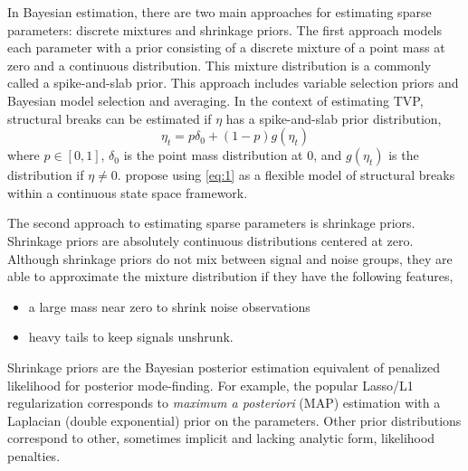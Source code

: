 \documentclass{article}
\begin{document}
In Bayesian estimation, there are two main approaches for estimating sparse parameters: discrete mixtures and shrinkage priors.
The first approach models each parameter with a prior consisting of a discrete mixture of a point mass at zero and a continuous distribution.
This mixture distribution is a commonly called a spike-and-slab prior.
This approach includes variable selection priors and Bayesian model selection and averaging.
In the context of estimating TVP, structural breaks can be estimated if $\eta$ has a spike-and-slab prior distribution,
\begin{equation}
  \label{eq:1}
  \eta_{t} = p \delta_{0} +  (1 - p) g(\eta_{t})
\end{equation}
where $p \in [0, 1]$, $\delta_{0}$ is the point mass distribution at 0, and $g(\eta_{t})$ is the distribution if $\eta \neq 0$.
\textcite{GiordaniKohn2008} propose using \eqref{eq:1} as a flexible model of structural breaks within a continuous state space framework.

The second approach to estimating sparse parameters is shrinkage priors. 
Shrinkage priors are absolutely continuous distributions centered at zero.
Although shrinkage priors do not mix between signal and noise groups, they are able to approximate the mixture distribution if they have the following features,
\begin{itemize}
\item a large mass near zero to shrink noise observations
\item heavy tails to keep signals unshrunk.
\end{itemize}
Shrinkage priors are the Bayesian posterior estimation equivalent of penalized likelihood for posterior mode-finding.
For example, the popular Lasso/L1 regularization corresponds to \textit{maximum a posteriori} (MAP) estimation with a Laplacian (double exponential) prior on the parameters.
Other prior distributions correspond to other, sometimes implicit and lacking analytic form, likelihood penalties.
\end{document}
